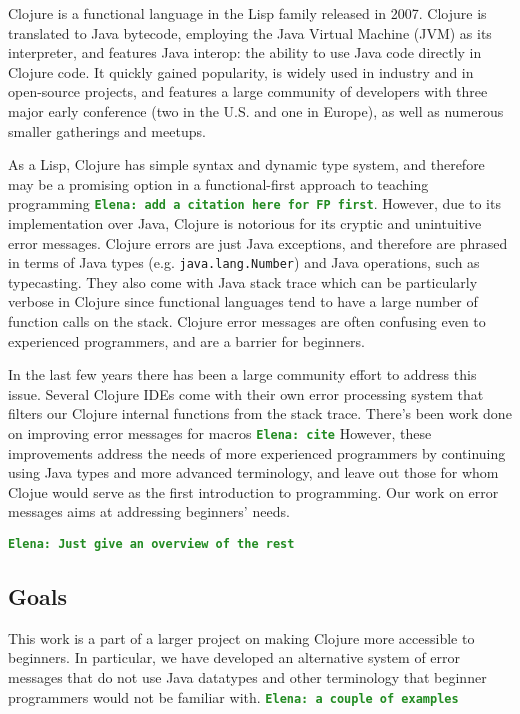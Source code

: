 \documentclass[12pt]{article}
\newcommand{\comment}[1]{{\bf \tt  {#1}}}
\newcommand{\emcomment}[1]{\textcolor{ForestGreen}{\comment{Elena: {#1}}}}
\begin{document}
Clojure is a functional language in the Lisp family released in 2007. 
Clojure is translated to Java bytecode, employing the Java Virtual Machine (JVM) as its interpreter, and features Java interop: the ability to use Java code directly in Clojure code. 
It quickly gained popularity, is widely used in industry and in open-source projects, and features a large community of developers with three major early conference (two in the U.S. and one in Europe), as well as numerous smaller gatherings and meetups. 

As a Lisp, Clojure has simple syntax and dynamic type system, and therefore may be a promising option in a functional-first approach to teaching programming \emcomment{add a citation here for FP first}. However, due to its implementation over Java, Clojure is notorious for its cryptic and unintuitive error messages. Clojure errors are just Java exceptions, and therefore are phrased in terms of Java types (e.g. \texttt{java.lang.Number}) and Java operations, such as typecasting. They also come with Java stack trace which can be particularly verbose in Clojure since functional languages tend to have a large number of function calls on the stack. Clojure error messages are often confusing even to experienced programmers, and are a barrier for beginners. 

In the last few years there has been a large community effort to address this issue. Several Clojure IDEs come with their own error processing system that filters our Clojure internal functions from the stack trace. There's been work done on improving error messages for macros \emcomment{cite} However, these improvements address the needs of more experienced programmers by continuing using Java types and more advanced terminology, and leave out those for whom Clojue would serve as the first introduction to programming. Our work on error messages aims at addressing beginners' needs.  

\emcomment{Just give an overview of the rest}

	\subsection{Goals}\label{sec:goals}
This work is a part of a larger project on making Clojure more accessible to beginners. In particular, we have developed an alternative system of error messages that do not use Java datatypes and other terminology that beginner programmers would not be familiar with. 
\emcomment{a couple of examples}
\end{document}

